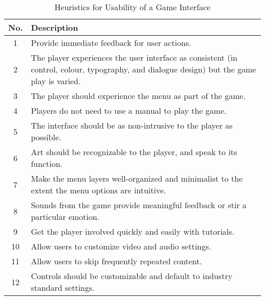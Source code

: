 \documentclass[12pt]{report}
\begin{document}
\begin{table}[ht]
\caption{Heuristics for Usability of a Game Interface} %
\centering  %
\begin{tabular}{c p{\textwidth}}
\hline\hline                        %
No. & Description \\ [0.5ex] %
\hline                  %
1 & Provide immediate feedback for user actions.\cite{Desurvire}  \\ %
2 & The player experiences the user interface as consistent (in control, colour, typography, and dialogue design) but the game play is varied.\cite{Desurvire}  \\
3 & The player should experience the menu as part of the game.\cite{Desurvire}  \\
4 & Players do not need to use a manual to play the game.\cite{Desurvire}  \\
5 & The interface should be as non-intrusive to the player as possible.\cite{Desurvire}  \\ 
6 & Art should be recognizable to the player, and speak to its function.\cite{Desurvire} \\
7 & Make the menu layers well-organized and minimalist to the extent the menu options are intuitive.\cite{Desurvire} \\
8 & Sounds from the game provide meaningful feedback or stir a particular emotion.\cite{Desurvire} \\
9 & Get the player involved quickly and easily with tutorials.\cite{Desurvire} \\
10 & Allow users to customize video and audio settings.\cite{Pinelle} \\ 
11 & Allow users to skip frequently repeated content.\cite {Pinelle} \\
12 & Controls should be customizable and default to industry standard settings. \cite{Federoff} \\ [1ex]%
\hline %
\end{tabular}
\label{tab:nonlin} %
\end{table}
\end{document}
